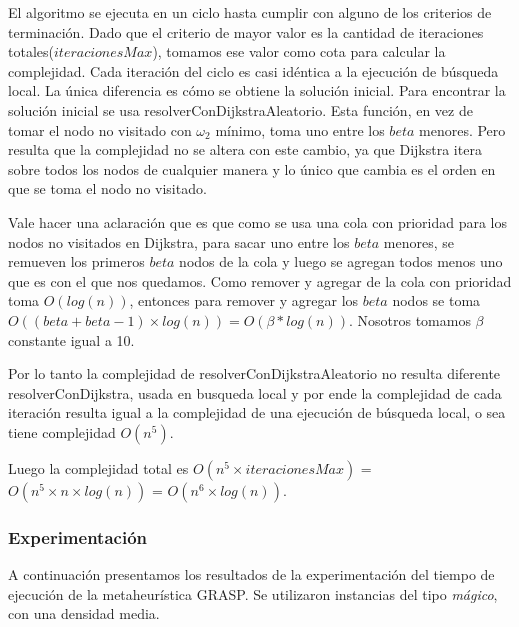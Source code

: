 El algoritmo se ejecuta en un ciclo hasta cumplir con alguno de los criterios de terminación. Dado que el criterio de mayor valor es la cantidad de iteraciones totales($iteracionesMax$), tomamos ese valor como cota para calcular la complejidad.
Cada iteración del ciclo es casi idéntica a la ejecución de búsqueda local. La única diferencia es cómo se obtiene la solución inicial. Para encontrar la solución inicial se usa resolverConDijkstraAleatorio. Esta función, en vez de tomar el nodo no visitado con $\omega_2$ mínimo, toma uno entre los $beta$ menores. Pero resulta que la complejidad no se altera con este cambio, ya que Dijkstra itera sobre todos los nodos de cualquier manera y lo único que cambia es el orden en que se toma el nodo no visitado. 

Vale hacer una aclaración que es que como se usa una cola con prioridad para los nodos no visitados en Dijkstra, para sacar uno entre los $beta$ menores, se remueven los primeros $beta$ nodos de la cola y luego se agregan todos menos uno que es con el que nos quedamos. Como remover y agregar de la cola con prioridad toma $O(log(n))$, entonces para remover y agregar los $beta$ nodos se toma $O((beta + beta-1) \times log(n)) = O(\beta*log(n))$. Nosotros tomamos $\beta$ constante igual a 10.

Por lo tanto la complejidad de resolverConDijkstraAleatorio no resulta diferente resolverConDijkstra, usada en busqueda local y por ende la complejidad de cada iteración resulta igual a la complejidad de una ejecución de búsqueda local, o sea tiene complejidad $O(n^5)$.

Luego la complejidad total es $O(n^5  \times  iteracionesMax)$ = $O(n^5  \times  n \times log(n))$ = $O(n^6  \times  log(n))$.

\subsubsection{Experimentación}

A continuación presentamos los resultados de la experimentación del tiempo de ejecución de la metaheurística GRASP. Se utilizaron instancias del tipo \textit{mágico}, con una densidad media.

